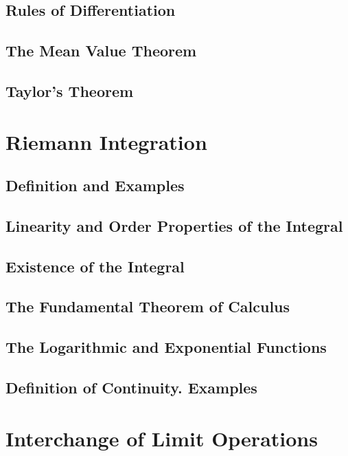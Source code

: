 \documentclass{article}
\theoremstyle{definition}
\theoremstyle{theorem}
\begin{document}
		\subsection{Rules of Differentiation}		
		
		\subsection{The Mean Value Theorem}
		
		\subsection{Taylor's Theorem}	
	
	\section{Riemann Integration}
		\subsection{Definition and Examples}
		
		\subsection{Linearity and Order Properties of the Integral}
		
		\subsection{Existence of the Integral}
		
		\subsection{The Fundamental Theorem of Calculus}
		
		\subsection{The Logarithmic and Exponential Functions}
		
		\subsection{Definition of Continuity. Examples}
	
	
	\section{Interchange of Limit Operations}
\end{document}
